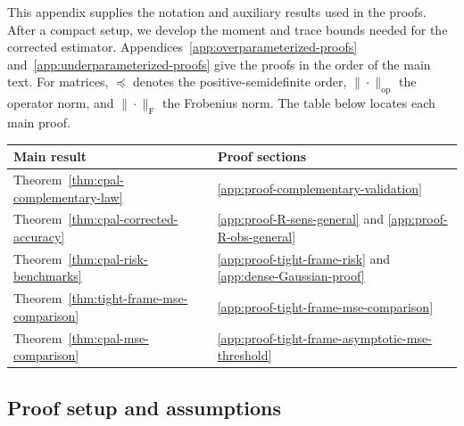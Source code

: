 \documentclass{article}
\theoremstyle{plain} %
\theoremstyle{definition} %
\theoremstyle{definition} %
\begin{document}
This appendix supplies the notation and auxiliary results used in the
proofs. After a compact setup, we develop the moment and trace bounds
needed for the corrected estimator. Appendices~\ref{app:overparameterized-proofs}
and~\ref{app:underparameterized-proofs} give the proofs in the order of
the main text.
For matrices, $\preceq$ denotes the positive-semidefinite order,
$\|\cdot\|_{\mathrm{op}}$ the operator norm, and
$\|\cdot\|_{\mathrm F}$ the Frobenius norm.
The table below locates each main proof.
\begin{center}
\begin{tabular}{@{}ll@{}}
\toprule
Main result & Proof sections \\
\midrule
Theorem~\ref{thm:cpal-complementary-law} & \ref{app:proof-complementary-validation} \\
Theorem~\ref{thm:cpal-corrected-accuracy} & \ref{app:proof-R-sens-general} and \ref{app:proof-R-obs-general} \\
Theorem~\ref{thm:cpal-risk-benchmarks} & \ref{app:proof-tight-frame-risk} and \ref{app:dense-Gaussian-proof} \\
Theorem~\ref{thm:tight-frame-mse-comparison} & \ref{app:proof-tight-frame-mse-comparison} \\
Theorem~\ref{thm:cpal-mse-comparison} & \ref{app:proof-tight-frame-asymptotic-mse-threshold} \\
\bottomrule
\end{tabular}
\end{center}

\subsection{Proof setup and assumptions}
\label{app:proof-setup}
\end{document}
